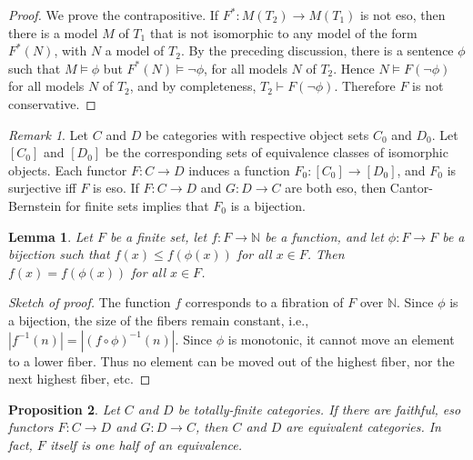 \documentclass[12pt]{article}
\newtheorem{prop}{Proposition}
\newtheorem{lemma}[prop]{Lemma}
\theoremstyle{definition}
\theoremstyle{remark}
\newtheorem*{note}{Remark}
\newcommand{\3}{\mathcal}
\begin{document}
\begin{proof} We prove the contrapositive. If $F^*:M(T_2)\to M(T_1)$
  is not eso, then there is a model $M$ of $T_1$ that is not
  isomorphic to any model of the form $F^*(N)$, with $N$ a model of
  $T_2$. By the preceding discussion, there is a sentence $\phi$ such
  that $M\vDash \phi$ but $F^*(N)\vDash\neg \phi$, for all models $N$
  of $T_2$. Hence $N\vDash F(\neg \phi )$ for all models $N$ of $T_2$,
  and by completeness, $T_2\vdash F(\neg \phi )$. Therefore $F$ is not
  conservative. \end{proof}

\begin{note} Let $C$ and $D$ be categories with respective object sets
  $C_0$ and $D_0$. Let $[C_0]$ and $[D_0]$ be the corresponding sets
  of equivalence classes of isomorphic objects. Each functor
  $F:C\to D$ induces a function $F_0:[C_0]\to [D_0]$, and $F_0$ is
  surjective iff $F$ is eso. If $F:C\to D$ and $G:D\to C$ are both
  eso, then Cantor-Bernstein for finite sets implies that $F_0$ is a
  bijection. \end{note}

\begin{lemma} Let $F$ be a finite set, let $f:F\to\mathbb{N}$ be a
  function, and let $\phi :F\to F$ be a bijection such that
  $f(x)\leq f(\phi (x))$ for all $x\in F$. Then $f(x)=f(\phi (x))$ for
  all $x\in F$. \end{lemma}

\begin{proof}[Sketch of proof] The function $f$ corresponds to a
  fibration of $F$ over $\mathbb{N}$. Since $\phi$ is a bijection, the
  size of the fibers remain constant, i.e.,
  $|f^{-1}(n)|=|(f\circ \phi )^{-1}(n)|$. Since $\phi$ is monotonic,
  it cannot move an element to a lower fiber. Thus no element can be
  moved out of the highest fiber, nor the next highest fiber,
  etc. \end{proof}

\begin{prop} Let $C$ and $D$ be totally-finite categories. If there
  are faithful, eso functors $F:C\to D$ and $G:D\to C$, then $C$ and
  $D$ are equivalent categories. In fact, $F$ itself is one half of an
  equivalence. \end{prop}
\end{document}
